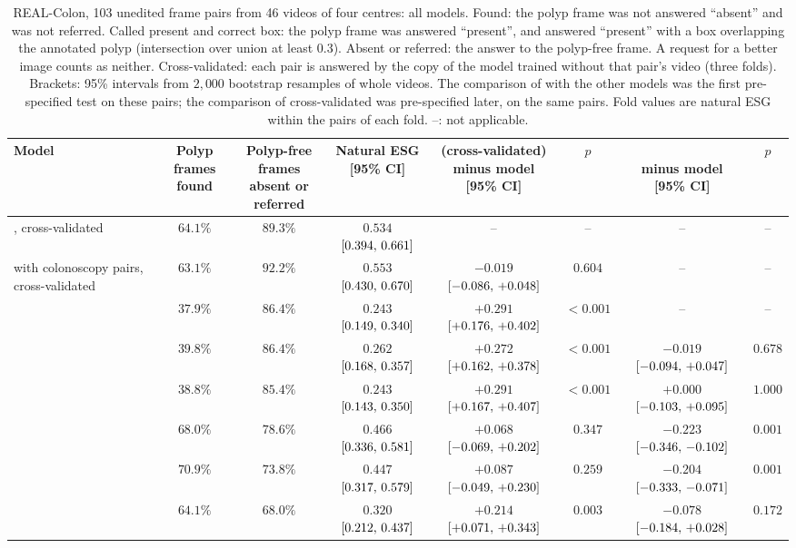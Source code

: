 \begin{table}[!htbp]
\caption{REAL-Colon, 103 unedited frame pairs from 46 videos of four centres: all models. Found: the polyp frame was not answered ``absent'' and was not referred. Called present and correct box: the polyp frame was answered ``present'', and answered ``present'' with a box overlapping the annotated polyp (intersection over union at least 0.3). Absent or referred: the answer to the polyp-free frame. A request for a better image counts as neither. Cross-validated: each pair is answered by the copy of the model trained without that pair's video (three folds). Brackets: 95\% intervals from $2{,}000$ bootstrap resamples of whole videos. The comparison of \ms{} with the other models was the first pre-specified test on these pairs; the comparison of cross-validated \msn{} was pre-specified later, on the same pairs. Fold values are natural ESG within the pairs of each fold. --: not applicable.}
\label{tab:s_realcolon}
\centering
\footnotesize
\begin{adjustbox}{max width=\linewidth}
\begin{tabular}{l cc c cc cc}
\toprule
Model & \shortstack{Polyp frames\\found} & \shortstack{Polyp-free frames\\absent or referred} & \shortstack{Natural ESG\\{}[95\% CI]} & \shortstack{\msn{} (cross-validated)\\minus model [95\% CI]} & $p$ & \shortstack{\ms{}\\minus model [95\% CI]} & $p$ \\
\midrule
\msn{}, cross-validated & $64.1\%$ & $89.3\%$ & $0.534$ $[0.394,\,0.661]$ & -- & -- & -- & -- \\
\msp{} with colonoscopy pairs, cross-validated & $63.1\%$ & $92.2\%$ & $0.553$ $[0.430,\,0.670]$ & $-0.019$ $[-0.086,\,+0.048]$ & $0.604$ & -- & -- \\
\ms{} & $37.9\%$ & $86.4\%$ & $0.243$ $[0.149,\,0.340]$ & $+0.291$ $[+0.176,\,+0.402]$ & $<0.001$ & -- & -- \\
\msp{} & $39.8\%$ & $86.4\%$ & $0.262$ $[0.168,\,0.357]$ & $+0.272$ $[+0.162,\,+0.378]$ & $<0.001$ & $-0.019$ $[-0.094,\,+0.047]$ & $0.678$ \\
\base{} & $38.8\%$ & $85.4\%$ & $0.243$ $[0.143,\,0.350]$ & $+0.291$ $[+0.167,\,+0.407]$ & $<0.001$ & $+0.000$ $[-0.103,\,+0.095]$ & $1.000$ \\
\gem{} & $68.0\%$ & $78.6\%$ & $0.466$ $[0.336,\,0.581]$ & $+0.068$ $[-0.069,\,+0.202]$ & $0.347$ & $-0.223$ $[-0.346,\,-0.102]$ & $0.001$ \\
\opus{} & $70.9\%$ & $73.8\%$ & $0.447$ $[0.317,\,0.579]$ & $+0.087$ $[-0.049,\,+0.230]$ & $0.259$ & $-0.204$ $[-0.333,\,-0.071]$ & $0.001$ \\
\gpt{} & $64.1\%$ & $68.0\%$ & $0.320$ $[0.212,\,0.437]$ & $+0.214$ $[+0.071,\,+0.343]$ & $0.003$ & $-0.078$ $[-0.184,\,+0.028]$ & $0.172$ \\
\bottomrule
\end{tabular}
\end{adjustbox}


\end{table}
